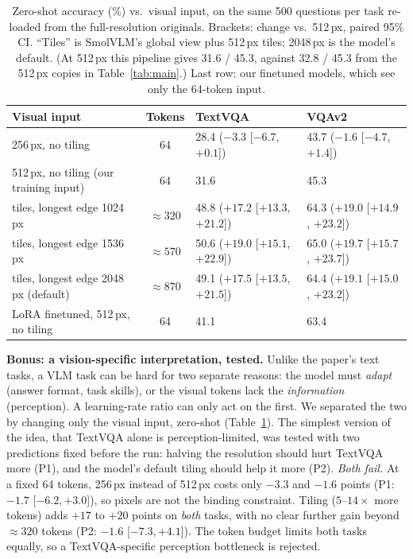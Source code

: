\documentclass[10pt,a4paper]{article}
\begin{document}
\begin{table}[t]
\centering\small
\caption{Zero-shot accuracy (\%) vs.\ visual input, on the same 500 questions per task re-loaded from the
full-resolution originals. Brackets: change vs.\ 512\,px, paired 95\% CI. ``Tiles'' is SmolVLM's global view plus
512\,px tiles; 2048\,px is the model's default. (At 512\,px this pipeline gives 31.6 / 45.3, against 32.8 / 45.3 from the
512\,px copies in Table~\ref{tab:main}.) Last row: our finetuned models, which see only the 64-token input.}
\label{tab:res}
\setlength{\tabcolsep}{5pt}
\begin{tabular}{@{}lcll@{}}
\toprule
Visual input & Tokens & TextVQA & VQAv2 \\
\midrule
256\,px, no tiling & 64 & 28.4 \;($-3.3$ [$-6.7$, $+0.1$]) & 43.7 \;($-1.6$ [$-4.7$, $+1.4$]) \\
512\,px, no tiling (our training input) & 64 & 31.6 & 45.3 \\
tiles, longest edge 1024\,px & ${\approx}320$ & 48.8 \;($+17.2$ [$+13.3$, $+21.2$]) & 64.3 \;($+19.0$ [$+14.9$, $+23.2$]) \\
tiles, longest edge 1536\,px & ${\approx}570$ & 50.6 \;($+19.0$ [$+15.1$, $+22.9$]) & 65.0 \;($+19.7$ [$+15.7$, $+23.7$]) \\
tiles, longest edge 2048\,px (default) & ${\approx}870$ & 49.1 \;($+17.5$ [$+13.5$, $+21.5$]) & 64.4 \;($+19.1$ [$+15.0$, $+23.2$]) \\
\midrule
LoRA finetuned, 512\,px, no tiling & 64 & 41.1 & 63.4 \\
\bottomrule
\end{tabular}
\end{table}

\textbf{Bonus: a vision-specific interpretation, tested.} Unlike the paper's text tasks, a VLM task can be hard for two
separate reasons: the model must \emph{adapt} (answer format, task skills), or the visual tokens lack the
\emph{information} (perception). A learning-rate ratio can only act on the first. We separated the two by changing only
the visual input, zero-shot (Table~\ref{tab:res}). The simplest version of the idea, that TextVQA alone is
perception-limited, was tested with two predictions fixed before the run: halving the resolution should hurt TextVQA
more (P1), and the model's default tiling should help it more (P2). \emph{Both fail.} At a fixed 64 tokens, 256\,px instead
of 512\,px costs only $-3.3$ and $-1.6$ points (P1: $-1.7$ [$-6.2,+3.0$]), so pixels are not the binding constraint.
Tiling ($5$--$14\times$ more tokens) adds $+17$ to $+20$ points on \emph{both} tasks, with no clear further gain beyond
${\approx}320$ tokens (P2: $-1.6$ [$-7.3,+4.1$]). The token budget limits both tasks equally, so a TextVQA-specific
perception bottleneck is rejected.
\end{document}
